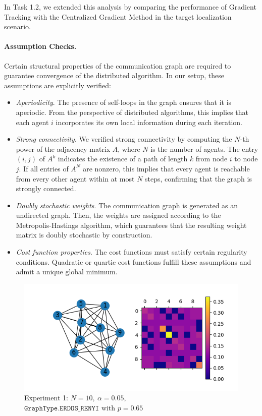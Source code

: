 In Task 1.2, we extended this analysis by comparing the performance of Gradient Tracking with the Centralized Gradient Method in the target localization scenario.
\paragraph{Assumption Checks.}
Certain structural properties of the communication graph are required to guarantee convergence of the distributed algorithm. In our setup, these assumptions are explicitly verified:

\begin{itemize}
    \item \textit{Aperiodicity}. The presence of self-loops in the graph ensures that it is aperiodic. From the perspective of distributed algorithms, this implies that each agent $i$ incorporates its own local information during each iteration.
    
    \item \textit{Strong connectivity}. We verified strong connectivity by computing the $N$-th power of the adjacency matrix $A$, where $N$ is the number of agents. The entry $(i, j)$ of $A^k$ indicates the existence of a path of length $k$ from node $i$ to node $j$. If all entries of $A^N$ are nonzero, this implies that every agent is reachable from every other agent within at most $N$ steps, confirming that the graph is strongly connected.
    
    \item \textit{Doubly stochastic weights}. The communication graph is generated as an undirected graph. Then, the weights are assigned according to the Metropolis-Hastings algorithm, which guarantees that the resulting weight matrix is doubly stochastic by construction.

    \item \textit{Cost function properties}. The cost functions must satisfy certain regularity conditions. Quadratic or quartic cost functions fulfill these assumptions and admit a unique global minimum.

\end{itemize}


\begin{figure}[h!]
    \centering
    \includegraphics[width=0.45\linewidth]{report/figs/gradient_tracking_graph_1.png}
    \caption{Experiment 1: $N=10, \ \alpha=0.05$, $\texttt{GraphType.ERDOS\_RENYI} \text{ with } p=0.65$}
    \label{fig:gradient_tracking_graph}
\end{figure}

